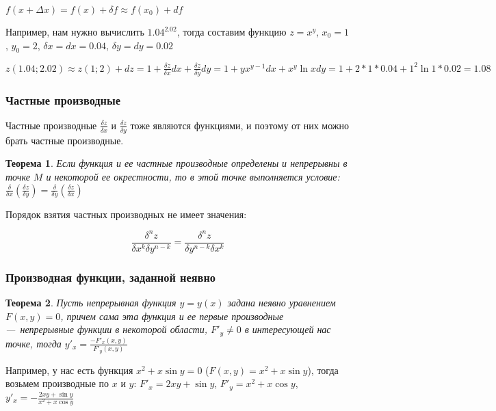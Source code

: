 \documentclass{article}
\newtheorem{theorem}{Теорема}
\begin{document}
\begin{flushleft}
\hfill

\hfill

$f(x + \Delta x) = f(x) + \delta f \approx f(x_0) + d f$

Например, нам нужно вычислить $1.04^{2.02}$, тогда составим функцию $z = x^y$, $x_0 = 1$, $y_0 = 2$, $\delta x = d x = 0.04$, $\delta y = d y = 0.02$

$z(1.04; 2.02) \approx z(1; 2) + d z = 1 + \frac{\delta z}{\delta x} dx + \frac{\delta z}{\delta y} dy = 1 + yx^{y - 1} dx + x^y \ln x d y = 1 + 2 * 1 * 0.04 + 1^2 \ln 1 * 0.02 = 1.08$

\subsubsection{Частные производные}

Частные производные $\frac{\delta z}{\delta x}$ и $\frac{\delta z}{\delta y}$ тоже являются функциями, и поэтому от них можно брать частные производные.

\begin{theorem}

Если функция и ее частные производные определены и непрерывны в точке $M$ и некоторой ее окрестности, то в этой точке выполняется условие: $\frac{\delta}{\delta x} (\frac{\delta z}{\delta y}) = \frac{\delta}{\delta y} (\frac{\delta z}{\delta x})$

\end{theorem}

Порядок взятия частных производных не имеет значения:

$$\frac{\delta^n z}{\delta x^k \delta y^{n - k}} = \frac{\delta^n z}{\delta y^{n - k} \delta x^{k}}$$

\subsubsection{Производная функции, заданной неявно}

\begin{theorem}
    Пусть непрерывная функция $y = y(x)$ задана неявно уравнением $F(x, y) = 0$, причем сама эта функция и ее первые производные — непрерывные функции в некоторой области, $F'_y \ne 0$ в интересующей нас точке, тогда $y'_x = \frac{-F'_x(x, y)}{F'_y(x, y)}$
\end{theorem}

Например, у нас есть функция $x^2 + x \sin y = 0$ ($F(x, y) = x^2 + x \sin y$), тогда возьмем производные по $x$ и $y$: $F'_x = 2 x y + \sin y$, $F'_y = x^2 + x \cos y$, $y'_x = -\frac{2 x y + \sin y}{x^2 + x \cos y}$


\end{flushleft}
\end{document}
